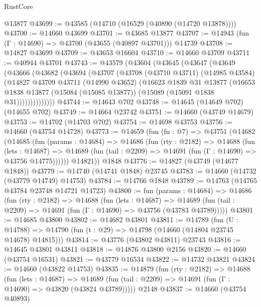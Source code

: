\begin{lexlean}{RustCore}
\begin{coremodule}
    @13877
@43699 := @43585 (@14710 (@16529 (@40890 (@14720 @13878))))
@43700 := @14660 @43699
@43701 := @43685 @13877
@43707 := @14943 (fun (Γ : @14690) => @43700 (@43655 (@40897 @43701))) @14739
@43708 := @14827 @43699
@43709 := @43653 @16604
@43710 := @14660 @43709
@43711 := @40944 @43701
@43743 := @43579
    (@43604
      (@43645
        (@43647
          (@43649
            (@43666
              (@43682
                (@43694
                  (@43707
                    (@43708
                      (@43710 @43711)
                      (@14985 @43584)
                      (@14827
                        @43709
                        @43711
                        (@14990 @43652)
                        (@16623
                          @1839
                          @31
                          @13877
                          (@16653
                            @1838
                            @13877
                            (@15084 (@15085 @13877))
                            (@15089 (@15091 @1838 @31))))))))))))))
@43744 := @14643 @702
@43748 := @14645 (@14649 @702) (@14655 @702)
@43749 := @14664 @23742
@43751 := @14660 (@43749 @14679)
@43753 := @14702 (@14703 @702)
@43754 := @14698 @43753
@43756 := @14660 (@43754 @14728)
@43773 := @14659
    (fun (fn : @7) =>
    @43751
      (@14682
        (@14685
          (fun (params : @14684) =>
          @14686
            (fun (rty : @2182) =>
            @14688
              (fun (lets : @14687) =>
              @14689 (fun (tail : @2209) => @14691 (fun (Γ : @14690) => @43756 @14775))))))
        @14821))
    @1848
@43776 := @14827 (@43749 (@14677 @1848))
@43779 := @14740 (@14741 @1848) @23745
@43783 := @14660 (@14732 (@43779 @14749) @14753)
@43784 := @14766 @1848
@43789 := @14763 (@14765 @43784 @23748 @14721 @14723)
@43800 := fun (params : @14684) =>
  @14686
    (fun (rty : @2182) =>
    @14688
      (fun (lets : @14687) =>
      @14689 (fun (tail : @2209) => @14691 (fun (Γ : @14690) => @43756 (@43783 @43789)))))
@43801 := @14685 @43800
@43802 := @14682 @43801
@43811 := @14789
    (fun (U : @14788) => @14790 (fun (t : @29) => @14798 (@14660 (@14804 @23745 @14678) @14815)))
@43814 := @43776 (@43802 @43811) @23743
@43816 := @14645 @43801 @43811
@43818 := @14876 @43800 @2156
@43820 := @14660 (@43754 @16531)
@43821 := @43779 @16534
@43822 := @14732 @43821
@43824 := @14660 (@43822 @14753)
@43835 := @14879
    (fun (rty : @2182) =>
    @14688
      (fun (lets : @14687) =>
      @14689 (fun (tail : @2209) => @14691 (fun (Γ : @14690) => @43820 (@43824 @43789)))))
    @2148
@43837 := @14660 (@43754 @40893)

\end{coremodule}
\end{lexlean}
